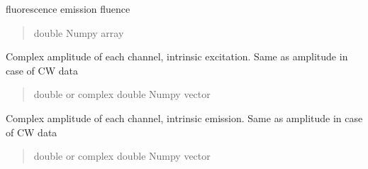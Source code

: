 \documentclass[letterpaper,10pt,english]{sphinxmanual}
\begin{document}
\begin{fulllineitems}
\begin{fulllineitems}
\label{\detokenize{_autosummary/nirfasterff.base.data.FLdata:nirfasterff.base.data.FLdata.phifl}}
\pysigstartsignatures
{}
\pysigstopsignatures
\sphinxAtStartPar
fluorescence emission fluence
\begin{quote}\begin{description}
\sphinxAtStartPar
double Numpy array

\end{description}\end{quote}

\end{fulllineitems}


\begin{fulllineitems}
\label{\detokenize{_autosummary/nirfasterff.base.data.FLdata:nirfasterff.base.data.FLdata.complexx}}
\pysigstartsignatures
{}
\pysigstopsignatures
\sphinxAtStartPar
Complex amplitude of each channel, intrinsic excitation. Same as amplitude in case of CW data
\begin{quote}\begin{description}
\sphinxAtStartPar
double or complex double Numpy vector

\end{description}\end{quote}

\end{fulllineitems}


\begin{fulllineitems}
\label{\detokenize{_autosummary/nirfasterff.base.data.FLdata:nirfasterff.base.data.FLdata.complexmm}}
\pysigstartsignatures
{}
\pysigstopsignatures
\sphinxAtStartPar
Complex amplitude of each channel, intrinsic emission. Same as amplitude in case of CW data
\begin{quote}\begin{description}
\sphinxAtStartPar
double or complex double Numpy vector


\end{description}
\end{quote}
\end{fulllineitems}
\end{fulllineitems}
\end{document}
